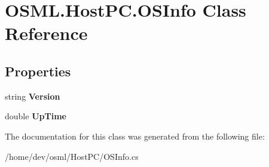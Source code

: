 \hypertarget{classOSML_1_1HostPC_1_1OSInfo}{}\section{O\+S\+M\+L.\+Host\+P\+C.\+O\+S\+Info Class Reference}
\label{classOSML_1_1HostPC_1_1OSInfo}
\subsection*{Properties}
\begin{DoxyCompactItemize}
\item 
\mbox{\label{classOSML_1_1HostPC_1_1OSInfo_aba4487025410fa747a24bc2f67042b02}} 
string {\bfseries Version}
\item 
\mbox{\label{classOSML_1_1HostPC_1_1OSInfo_a12a0b594ff7fd5e68aab899c1061c133}} 
double {\bfseries Up\+Time}
\end{DoxyCompactItemize}


The documentation for this class was generated from the following file\+:\begin{DoxyCompactItemize}
\item 
/home/dev/osml/\+Host\+P\+C/O\+S\+Info.\+cs\end{DoxyCompactItemize}
